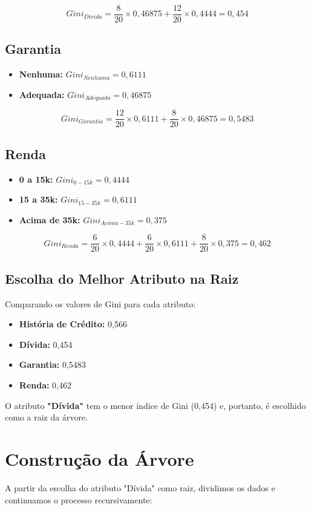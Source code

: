 \documentclass[a4paper,12pt]{article}
\begin{document}
\[
Gini_{Divida} = \frac{8}{20} \times 0,46875 + \frac{12}{20} \times 0,4444 = 0,454
\]

\subsection{Garantia}
\begin{itemize}
    \item \textbf{Nenhuma:} \(Gini_{Nenhuma} = 0,6111\)
    \item \textbf{Adequada:} \(Gini_{Adequada} = 0,46875\)
\end{itemize}

\[
Gini_{Garantia} = \frac{12}{20} \times 0,6111 + \frac{8}{20} \times 0,46875 = 0,5483
\]

\subsection{Renda}
\begin{itemize}
    \item \textbf{0 a 15k:} \(Gini_{0-15k} = 0,4444\)
    \item \textbf{15 a 35k:} \(Gini_{15-35k} = 0,6111\)
    \item \textbf{Acima de 35k:} \(Gini_{Acima-35k} = 0,375\)
\end{itemize}

\[
Gini_{Renda} = \frac{6}{20} \times 0,4444 + \frac{6}{20} \times 0,6111 + \frac{8}{20} \times 0,375 = 0,462
\]

\subsection{Escolha do Melhor Atributo na Raiz}
Comparando os valores de Gini para cada atributo:

\begin{itemize}
    \item \textbf{História de Crédito:} 0,566
    \item \textbf{Dívida:} 0,454
    \item \textbf{Garantia:} 0,5483
    \item \textbf{Renda:} 0,462
\end{itemize}

O atributo \textbf{"Dívida"} tem o menor índice de Gini (0,454) e, portanto, é escolhido como a raiz da árvore.

\section{Construção da Árvore}
A partir da escolha do atributo "Dívida" como raiz, dividimos os dados e continuamos o processo recursivamente:
\end{document}
